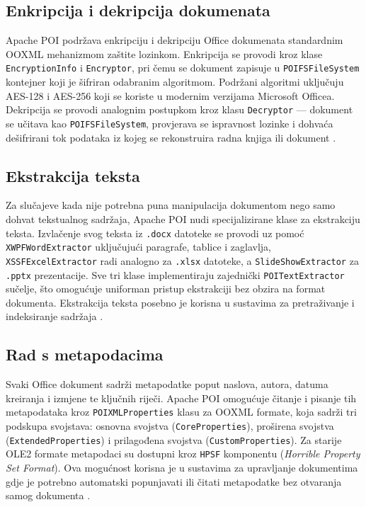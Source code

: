 \documentclass[]{foi}
\begin{document}
\subsection{Enkripcija i dekripcija dokumenata}

Apache POI podržava enkripciju i dekripciju Office dokumenata standardnim OOXML mehanizmom zaštite lozinkom. Enkripcija se provodi kroz klase \texttt{EncryptionInfo} i \texttt{Encryptor}, pri čemu se dokument zapisuje u \texttt{POIFSFileSystem} kontejner koji je šifriran odabranim algoritmom. Podržani algoritmi uključuju AES-128 i AES-256 koji se koriste u modernim verzijama Microsoft Officea. Dekripcija se provodi analognim postupkom kroz klasu \texttt{Decryptor} — dokument se učitava kao \texttt{POIFSFileSystem}, provjerava se ispravnost lozinke i dohvaća dešifrirani tok podataka iz kojeg se rekonstruira radna knjiga ili dokument \cite{apachePOIJavadoc}.

\subsection{Ekstrakcija teksta}

Za slučajeve kada nije potrebna puna manipulacija dokumentom nego samo dohvat tekstualnog sadržaja, Apache POI nudi specijalizirane klase za ekstrakciju teksta. Izvlačenje  svog teksta iz \texttt{.docx} datoteke se provodi uz pomoć \texttt{XWPFWordExtractor} uključujući paragrafe, tablice i zaglavlja, \texttt{XSSFExcelExtractor} radi analogno za \texttt{.xlsx} datoteke, a \texttt{SlideShowExtractor} za \texttt{.pptx} prezentacije. Sve tri klase implementiraju zajednički \texttt{POITextExtractor} sučelje, što omogućuje uniforman pristup ekstrakciji bez obzira na format dokumenta. Ekstrakcija teksta posebno je korisna u sustavima za pretraživanje i indeksiranje sadržaja \cite{apachePOIJavadoc}.

\subsection{Rad s metapodacima}

Svaki Office dokument sadrži metapodatke poput naslova, autora, datuma kreiranja i izmjene te ključnih riječi. Apache POI omogućuje čitanje i pisanje tih metapodataka kroz \texttt{POIXMLProperties} klasu za OOXML formate, koja sadrži tri podskupa svojstava: osnovna svojstva (\texttt{CoreProperties}), proširena svojstva (\texttt{ExtendedProperties}) i prilagođena svojstva (\texttt{CustomProperties}). Za starije OLE2 formate metapodaci su dostupni kroz \texttt{HPSF} komponentu (\textit{Horrible Property Set Format}). Ova mogućnost korisna je u sustavima za upravljanje dokumentima gdje je potrebno automatski popunjavati ili čitati metapodatke bez otvaranja samog dokumenta \cite{apachePOIJavadoc}.
\end{document}
